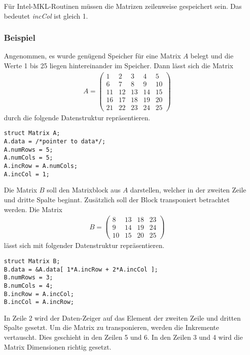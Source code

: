Für Intel-MKL-Routinen müssen die Matrizen zeilenweise gespeichert sein.
Das bedeutet \textit{incCol} ist gleich 1.

\subsubsection{Beispiel}
Angenommen, es wurde genügend Speicher für eine Matrix $A$ belegt und die Werte 1 bis 25 liegen hintereinander im Speicher.
Dann lässt sich die Matrix
\begin{align*}
	A = \begin{pmatrix}
	 1 &  2 &  3 &  4 &  5 \\
	 6 &  7 &  8 &  9 & 10 \\
	11 & 12 & 13 & 14 & 15 \\
	16 & 17 & 18 & 19 & 20 \\
	21 & 22 & 23 & 24 & 25 
	\end{pmatrix}
\end{align*}
durch die folgende Datenstruktur repräsentieren.
\begin{lstlisting}
struct Matrix A;
A.data = /*pointer to data*/;
A.numRows = 5; 
A.numCols = 5;
A.incRow = A.numCols;
A.incCol = 1;
\end{lstlisting}

Die Matrix $B$ soll den Matrixblock aus $A$ darstellen, welcher in der zweiten Zeile und dritte Spalte beginnt. Zusätzlich soll der Block transponiert betrachtet werden. Die Matrix
\begin{align*}
B = \begin{pmatrix}
8 &  13 &  18 & 23 \\
9 &  14 &  19 & 24 \\
10 &  15 &  20 & 25 
\end{pmatrix}
\end{align*}
lässt sich mit folgender Datenstruktur repräsentieren.
\begin{lstlisting}
struct Matrix B;
B.data = &A.data[ 1*A.incRow + 2*A.incCol ];
B.numRows = 3; 
B.numCols = 4;
B.incRow = A.incCol;
B.incCol = A.incRow;
\end{lstlisting}

In Zeile 2 wird der Daten-Zeiger auf das Element der zweiten Zeile und dritten Spalte gesetzt.
Um die Matrix zu transponieren, werden die Inkremente vertauscht. Dies geschieht in den Zeilen 5 und 6.  
In den Zeilen 3 und 4 wird die Matrix Dimensionen richtig gesetzt.


